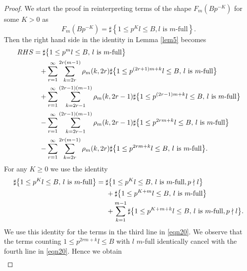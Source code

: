 \begin{proof}
We start the proof in reinterpreting terms of the shape $F_m\left(Bp^{-K}\right)$ for some $K>0$ as
\[
F_m\left(Bp^{-K}\right)= \sharp\left\{1\leq p^Kl\leq B, l \mbox{ is $m$-full}\right\}.
\]
Then the right hand side in the identity in Lemma \ref{lem5} becomes
\begin{equation}\label{eqn20}
\begin{split}
RHS &=\sharp\bigl\{1\leq p^ml\leq B,\, l \mbox{ is $m$-full}\bigr\} \\
&\hspace*{3mm}+\sum_{r=1}^{\infty} \sum_{k=2r}^{2r(m-1)}\rho_m(k,2r)\sharp\bigl\{1\leq p^{(2r+1)m+k}l\leq B,\, l \mbox{ is $m$-full}\bigr\}\\
&\hspace*{3mm}+ \sum_{r=1}^\infty\sum_{k=2r-1}^{(2r-1)(m-1)}\rho_m(k,2r-1)\sharp\bigl\{1\leq p^{(2r-1)m+k}l\leq B,\, l \mbox{ is $m$-full}\bigr\}\\
&\hspace*{3mm}-\sum_{r=1}^\infty \sum_{k=2r-1}^{(2r-1)(m-1)}\rho_m(k,2r-1)\sharp\bigl\{1\leq p^{2rm+k}l\leq B,\, l \mbox{ is $m$-full}\bigr\}\\
&\hspace*{3mm}-\sum_{r=1}^\infty\sum_{k=2r}^{2r(m-1)}\rho_m(k,2r)\sharp\bigl\{1\leq p^{2rm+k}l\leq B,\, l \mbox{ is $m$-full}\bigr\}.
\end{split}
\end{equation}
For any $K\geq 0$ we use the identity
\begin{equation}\label{eqn20b}
\begin{split}
\sharp\bigl\{1\leq p^{K}l\leq B,\, l \mbox{ is $m$-full}\bigr\} &= \sharp\bigl\{1\leq p^{K}l\leq B,\, l \mbox{ is $m$-full}, p\nmid l\bigr\}\\
&\hspace*{5mm}+ \sharp\bigl\{1\leq p^{K+m}l\leq B,\, l \mbox{ is $m$-full}\bigr\}\\
&\hspace*{5mm}+\sum_{k=1}^{m-1}\sharp\bigl\{1\leq p^{K+m+k}l\leq B,\, l \mbox{ is $m$-full}, p\nmid l\bigr\}.
\end{split}
\end{equation}
We use this identity for the terms in the third line in \eqref{eqn20}. We observe that the terms counting $1\leq p^{2rm+k}l\leq B$ with $l$ $m$-full identically cancel with the fourth line in \eqref{eqn20}. Hence we obtain
\begin{equation*}
\begin{split}

\end{split}
\end{equation*}
\end{proof}
